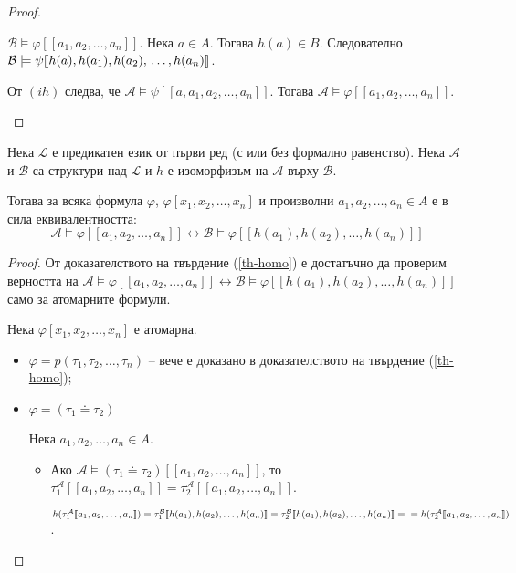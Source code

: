 \documentclass{article}
\def\Proofs{1}
\begin{document}
\begin{thm}
\begin{proof}
\begin{itemize}
$\mathcal{B} \models \varphi[\![a_1, a_2, \ldots, a_n]\!]$. Нека $a \in A$. Тогава $h(a) \in B$. Следователно $\mathcal{B} \models \psi[\![h(a), h(a_1), h(a_2), \\ \ldots, h(a_n)]\!]$. 

От $(ih)$ следва, че $\mathcal{A} \models \psi[\![a, a_1, a_2, \ldots, a_n]\!]$. Тогава $\mathcal{A} \models \varphi[\![a_1, a_2, \ldots, a_n]\!]$.

\end{itemize}
\end{proof}
\fi
\end{thm}

\begin{thm}
Нека $\mathcal{L}$ е предикатен език от първи ред (с или без формално равенство). Нека $\mathcal{A}$ и $\mathcal{B}$ са структури над $\mathcal{L}$ и $h$ е изоморфизъм на $\mathcal{A}$ върху $\mathcal{B}$.

Тогава за всяка формула $\varphi$, $\varphi[x_1, x_2, \ldots, x_n]$ и произволни $a_1, a_2, \ldots, a_n \in A$ е в сила еквивалентността: \[\mathcal{A} \models \varphi[\![a_1, a_2, \ldots, a_n]\!] \longleftrightarrow \mathcal{B} \models \varphi[\![h(a_1), h(a_2), \ldots, h(a_n)]\!]\]

\ifcase\Proofs\or
\begin{proof}
От доказателството на твърдение (\ref{th-homo}) е достатъчно да проверим верността на $\mathcal{A} \models \varphi[\![a_1, a_2, \ldots, a_n]\!] \longleftrightarrow \mathcal{B} \models \varphi[\![h(a_1), h(a_2), \ldots, h(a_n)]\!]$ само за атомарните формули.

Нека $\varphi[x_1, x_2, \ldots, x_n]$ е атомарна.
\begin{itemize}
\item $\varphi = p(\tau_1, \tau_2, \ldots, \tau_n)$ -- вече е доказано в доказателството на твърдение (\ref{th-homo});
\item $\varphi = (\tau_1 \doteq \tau_2)$

Нека $a_1, a_2, \ldots, a_n \in A$.
\begin{itemize}
\item Ако $\mathcal{A} \models (\tau_1 \doteq \tau_2)[\![a_1, a_2, \ldots, a_n]\!]$, то $\tau_1^\mathcal{A}[\![a_1, a_2, \ldots, a_n]\!] = \tau_2^\mathcal{A}[\![a_1, a_2, \ldots, a_n]\!]$.

$h(\tau_1^\mathcal{A}[\![a_1, a_2, \ldots, a_n]\!]) = \tau_1^\mathcal{B}[\![h(a_1), h(a_2), \ldots, h(a_n)]\!] = \tau_2^\mathcal{B}[\![h(a_1), h(a_2), \ldots, h(a_n)]\!] = \\ = h(\tau_2^\mathcal{A}[\![a_1, a_2, \ldots, a_n]\!])$. 


\end{itemize}
\end{itemize}
\end{proof}
\end{thm}
\end{document}
